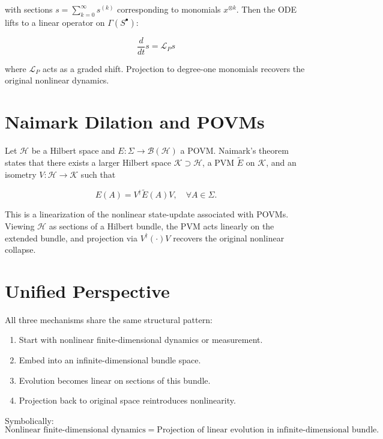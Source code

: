 \documentclass[12pt]{article}
\theoremstyle{definition}
\theoremstyle{plain}
\begin{document}
with sections $s = \sum_{k=0}^\infty s^{(k)}$ corresponding to monomials $x^{\otimes k}$. Then the ODE lifts to a linear operator on $\Gamma(S^\bullet)$:

\begin{equation}
\frac{d}{dt} s = \mathcal{L}_P s
\end{equation}

where $\mathcal{L}_P$ acts as a graded shift. Projection to degree-one monomials recovers the original nonlinear dynamics.

\section{Naimark Dilation and POVMs}

Let $\mathcal{H}$ be a Hilbert space and $E: \Sigma \to \mathcal{B}(\mathcal{H})$ a POVM. Naimark's theorem states that there exists a larger Hilbert space $\mathcal{K} \supset \mathcal{H}$, a PVM $\tilde{E}$ on $\mathcal{K}$, and an isometry $V: \mathcal{H} \to \mathcal{K}$ such that

\begin{equation}
E(A) = V^\dagger \tilde{E}(A) V, \quad \forall A \in \Sigma.
\end{equation}

This is a linearization of the nonlinear state-update associated with POVMs. Viewing $\mathcal{H}$ as sections of a Hilbert bundle, the PVM acts linearly on the extended bundle, and projection via $V^\dagger (\cdot) V$ recovers the original nonlinear collapse.

\section{Unified Perspective}

All three mechanisms share the same structural pattern:

\begin{enumerate}
    \item Start with nonlinear finite-dimensional dynamics or measurement.
    \item Embed into an infinite-dimensional bundle space.
    \item Evolution becomes linear on sections of this bundle.
    \item Projection back to original space reintroduces nonlinearity.
\end{enumerate}

Symbolically:
\[
\text{Nonlinear finite-dimensional dynamics} = \text{Projection of linear evolution in infinite-dimensional bundle}.
\]
\end{document}

